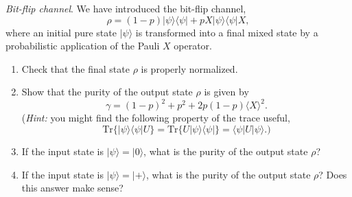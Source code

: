\begin{exercise}
\emph{Bit-flip channel}. We have introduced the bit-flip channel,
\begin{equation*}
    \rho = (1-p)|\psi\rangle\langle\psi| + p X|\psi\rangle\langle\psi|X,
\end{equation*}
where an initial pure state $|\psi\rangle$ is transformed into a final mixed state by a probabilistic application of the Pauli $X$ operator.
\begin{enumerate}[label=(\alph*)]
    \item Check that the final state $\rho$ is properly normalized.
    \item Show that the purity of the output state $\rho$ is given by
    \begin{equation}
        \gamma = (1-p)^2 + p^2 + 2p(1-p) \langle X\rangle^2.
    \end{equation}
    (\emph{Hint:} you might find the following property of the trace useful,
    \begin{equation*}
        \text{Tr}\{|\psi\rangle\langle\psi|U\} = \text{Tr}\{U|\psi\rangle\langle\psi|\} = \langle\psi|U|\psi\rangle.)
    \end{equation*}
    \item If the input state is $|\psi\rangle=|0\rangle$, what is the purity of the output state $\rho$?
    \item If the input state is $|\psi\rangle=|+\rangle$, what is the purity of the output state $\rho$? Does this answer make sense?
\end{enumerate}
\end{exercise}
